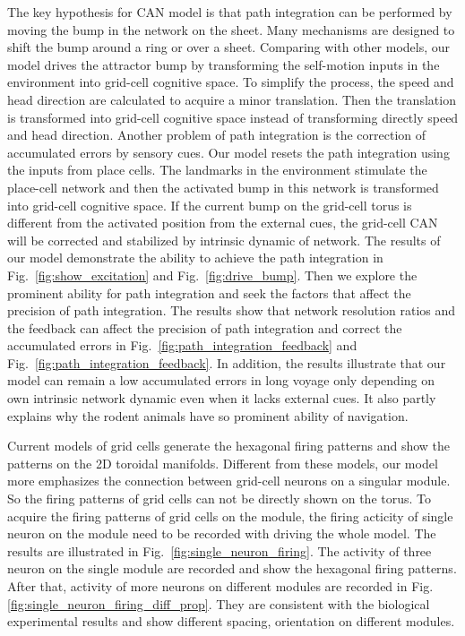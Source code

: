 \documentclass[final,5p,times,twocolumn,authoryear]{elsarticle}
\begin{document}
The key hypothesis for CAN model is that path integration can be performed by moving the bump in the network on the sheet\citep{Fuhs2006}. Many mechanisms are designed to shift the bump around a ring\citep{Zhang1996} or over a sheet\citep{Burak2009}. Comparing with other models, our model drives the attractor bump by transforming the self-motion inputs in the environment into grid-cell cognitive space. To simplify the process, the speed and head direction are calculated to acquire a minor translation. Then the translation is transformed into grid-cell cognitive space instead of transforming directly speed and head direction. Another problem of path integration is the correction of accumulated errors by sensory cues. Our model resets the path integration using the inputs from place cells. The landmarks in the environment stimulate the place-cell network and then the activated bump in this network is transformed into grid-cell cognitive space. If the current bump on the grid-cell torus is different from the activated position from the external cues, the grid-cell CAN will be corrected and stabilized by intrinsic dynamic of network. The results of our model demonstrate the ability to achieve the path integration in Fig.~\ref{fig:show_excitation} and Fig.~\ref{fig:drive_bump}. Then we explore the prominent ability for path integration and seek the factors that affect the precision of path integration. The results show that network resolution ratios and the feedback can affect the precision of path integration and correct the accumulated errors in Fig.~\ref{fig:path_integration_feedback} and Fig.~\ref{fig:path_integration_feedback}. In addition, the results illustrate that our model can remain a low accumulated errors in long voyage only depending on own intrinsic network dynamic even when it lacks external cues. It also partly explains why the rodent animals have so prominent ability of navigation.

	Current models of grid cells generate the hexagonal firing patterns and show the patterns on the 2D toroidal manifolds\citep{Fuhs2006,Burak2009,Guanella2007}. Different from these models, our model more emphasizes the connection between grid-cell neurons on a singular module. So the firing patterns of grid cells can not be directly shown on the torus. To acquire the firing patterns of grid cells on the module, the firing acticity of single neuron on the module need to be recorded with driving the whole model. The results are illustrated in Fig.~\ref{fig:single_neuron_firing}. The activity of three neuron on the single module are recorded and show the hexagonal firing patterns. After that, activity of more neurons on different modules are recorded in Fig.\ref{fig:single_neuron_firing_diff_prop}. They are consistent with the biological experimental results and show different spacing, orientation on different modules.
\end{document}
